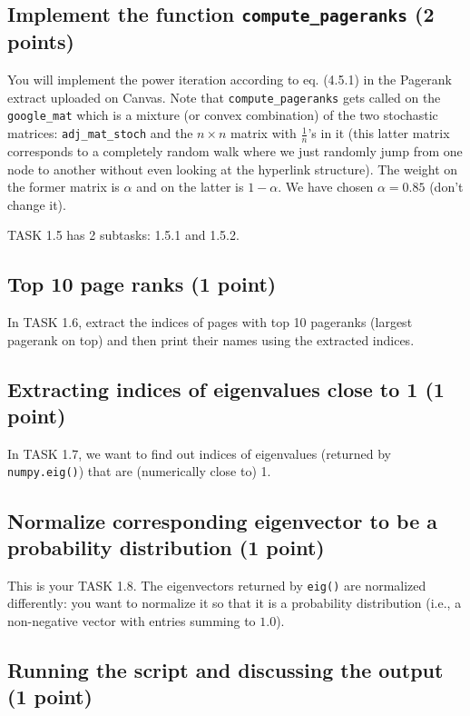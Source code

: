 \documentclass{article}
\begin{document}
\subsection{Implement the function {\tt compute\_pageranks} (2 points)}

You will implement the power iteration according to eq. (4.5.1) in the Pagerank extract uploaded on Canvas. Note that {\tt compute\_pageranks} gets called on the {\tt google\_mat}
which is a mixture (or convex combination) of the two stochastic matrices: {\tt adj\_mat\_stoch} and the $n \times n$ matrix with $\frac{1}{n}$'s in it (this latter matrix
corresponds to a completely random walk where we just randomly jump from one node to another without even looking at the hyperlink structure). The weight
on the former matrix is $\alpha$ and on the latter is $1-\alpha$. We have chosen $\alpha = 0.85$ (don't change it).

TASK 1.5 has 2 subtasks: 1.5.1 and 1.5.2.

\subsection{Top 10 page ranks (1 point)}

In TASK 1.6, extract the indices of pages with top 10 pageranks (largest pagerank on top) and then print their names using the extracted indices.

\subsection{Extracting indices of eigenvalues close to 1 (1 point)}

In TASK 1.7, we want to find out indices of eigenvalues (returned by {\tt numpy.eig()}) that are (numerically close to) 1.

\subsection{Normalize corresponding eigenvector to be a probability distribution (1 point)}

This is your TASK 1.8. The eigenvectors returned by {\tt eig()} are normalized differently: you want to normalize it so that it is a probability distribution (i.e.,
a non-negative vector with entries summing to $1.0$).

\subsection{Running the script and discussing the output (1 point)}
\end{document}
